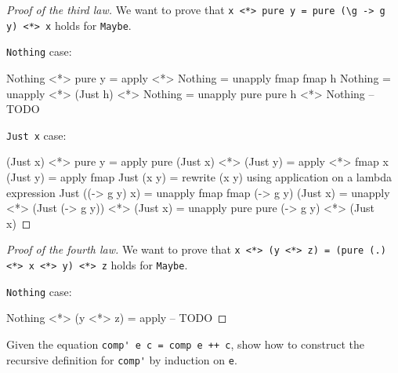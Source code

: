\documentclass[12pt]{article}
\newenvironment{code}{\endgraf\verbatim}{\endverbatim}
\newenvironment{problem}[2][Problem]{\begin{trivlist}
\item[\hskip \labelsep {\bfseries #1}\hskip \labelsep {\bfseries #2.}]}{\end{trivlist}}
\begin{document}
\begin{proof}[Proof of the third law]
We want to prove that \verb|x <*> pure y = pure (\g -> g y) <*> x| holds for \verb|Maybe|.

\verb|Nothing| case:


\begin{code}
  Nothing <*> pure y
=   { apply <*> }
  Nothing
=   { unapply fmap }
  fmap h Nothing
=   { unapply <*> }
  (Just h) <*> Nothing
=   { unapply pure }
  pure h <*> Nothing
-- TODO
\end{code}

\verb|Just x| case:

\begin{code}
  (Just x) <*> pure y
=   { apply pure }
  (Just x) <*> (Just y)
=   { apply <*> }
  fmap x (Just y)
=   { apply fmap }
  Just (x y)
=   { rewrite (x y) using application on a lambda expression }
  Just ((\g -> g y) x)
=   { unapply fmap }
  fmap (\g -> g y) (Just x)
=   { unapply <*> }
  (Just (\g -> g y)) <*> (Just x)
=   { unapply pure }
  pure (\g -> g y) <*> (Just x)
\end{code}
\end{proof}

\begin{proof}[Proof of the fourth law]
We want to prove that \verb|x <*> (y <*> z) = (pure (.) <*> x <*> y) <*> z| holds for \verb|Maybe|.

\verb|Nothing| case:

\begin{code}
  Nothing <*> (y <*> z)
=   { apply  }
-- TODO
\end{code}
\end{proof}


\begin{problem}{5}
Given the equation \verb|comp' e c = comp e ++ c|, show how to construct the recursive definition for \verb|comp'| by induction on \verb|e|.
\end{problem}
\end{document}

